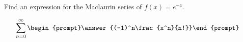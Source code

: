 \documentclass{ximera}
\author{Gregory Hartman \and Matthew Carr}
\begin{document}
\begin{exercise}






Find an expression for the Maclaurin series of $f(x)=e^{-x}$.

\[
\sum_{n=0}^{\infty}\begin{prompt}\answer{(-1)^n\frac{x^n}{n!}}\end{prompt}
\]

\end{exercise}
\end{document}
